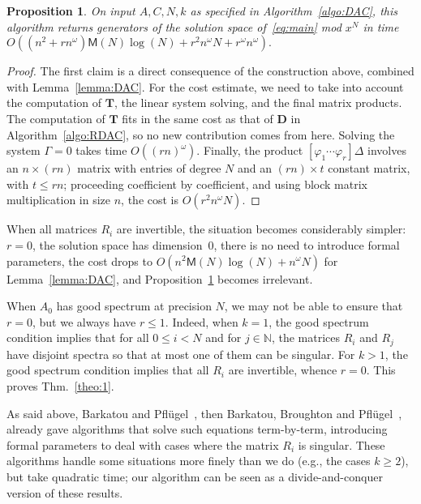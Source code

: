 \documentclass[]{sig-alternate}
\def\N {\ensuremath{\mathbb{N}}}
\def\M {\ensuremath{\mathsf{M}}}
\newtheorem{Prop}{Proposition}
\begin{document}
\begin{Prop}\label{prop:DAC}
  On input $A, C, N, k$ as specified in Algo\-rithm~\ref{algo:DAC}, this
  algorithm returns generators of the solution space
  of~\eqref{eq:main} mod $x^N$ in time $O((n^2+r n^\omega)
  \M(N)\log(N) + r^2 n^\omega N+ r^\omega n^\omega).$
\end{Prop}
\begin{proof}
  The first claim is a direct consequence of the construction above,
  combined with Lemma~\ref{lemma:DAC}.
For the cost estimate, we need
  to take into account the computation of $\mathbf{T}$, the linear
  system solving, and the final matrix products. The computation of
  $\mathbf{T}$ fits in the same cost as that of $\mathbf{D}$ in
  Algorithm~\ref{algo:RDAC}, so no new contribution comes from
  here. Solving the system $\Gamma=0$ takes time
  $O((rn)^\omega)$. Finally, the product $[ \varphi_1 \cdots \varphi_r ]
  \Delta$ involves an $n \times (rn)$ matrix with entries of degree
  $N$ and an $(rn) \times t$ constant matrix, with $t \le rn$;
  proceeding coefficient by coefficient, and using block matrix
  multiplication in size $n$, the cost is $O(r^2 n^\omega N)$.
\end{proof}
 
When all matrices $R_i$ are invertible, the situation becomes
considerably simpler: $r=0$, the solution space has dimension~0, there
is no need to introduce formal parameters, the cost drops to $O(n^2
\M(N)\log(N) + n^\omega N)$ for Lemma~\ref{lemma:DAC}, and
Proposition~\ref{prop:DAC} becomes irrelevant.

When $A_0$ has good spectrum at precision $N$, we may not be able to
ensure that $r=0$, but we always have $r \le 1$. Indeed, when $k=1$,
the good spectrum condition implies that for all $0\le i<N$ and
for $j\in\N$, the matrices $R_i$ and $R_j$
have disjoint spectra so that at most one of
them can be singular. For $k>1$, the good spectrum
condition implies that all $R_i$ are invertible, whence $r=0$. This proves
Thm.~\ref{theo:1}.

\smallskip{} As said above, Barkatou and
Pfl{\"u}gel~\cite{BaPf99}, then Barkatou, Broughton and
Pfl{\"u}gel~\cite{BaBrPf10}, already gave algorithms that solve such
equations term-by-term, introducing formal parameters to deal with
cases where the matrix $R_i$ is singular. These algorithms handle some
situations more finely than we do (e.g., the cases $k \ge 2$), but
take quadratic time; our algorithm can be seen as a
divide-and-conquer version of these results.
\end{document}
